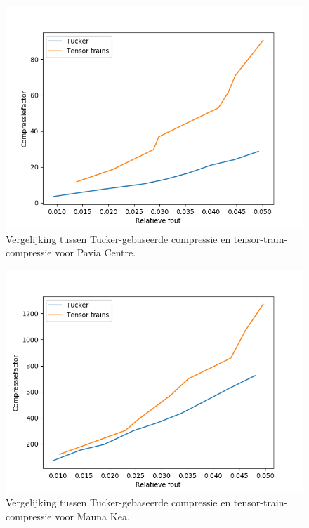 \begin{figure}[]
  \centering
  \includegraphics[scale=0.7]{images/tucker_vs_tensor_trains_Pavia_Centre.png}
  \caption{Vergelijking tussen Tucker-gebaseerde compressie en tensor-train-compressie voor Pavia Centre.}
\label{fig:tucker-vs-tensor-trains-pavia-centre}
\end{figure}

\begin{figure}[]
  \centering
  \includegraphics[scale=0.7]{images/tucker_vs_tensor_trains_Mauna_Kea.png}
  \caption{Vergelijking tussen Tucker-gebaseerde compressie en tensor-train-compressie voor Mauna Kea.}
\label{fig:tucker-vs-tensor-trains-mauna-kea}
\end{figure}

